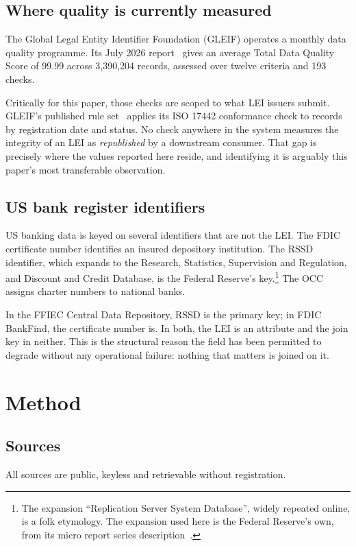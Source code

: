 \documentclass[11pt]{article}
\begin{document}
\subsection{Where quality is currently measured}
The Global Legal Entity Identifier Foundation (GLEIF) operates a monthly data quality programme. Its July 2026 report~\cite{gleifdq} gives an average Total Data Quality Score of 99.99 across 3,390,204 records, assessed over twelve criteria and 193 checks.

Critically for this paper, those checks are scoped to what LEI issuers submit. GLEIF's published rule set~\cite{gleifrules} applies its ISO 17442 conformance check to records by registration date and status. No check anywhere in the system measures the integrity of an LEI as \emph{republished} by a downstream consumer. That gap is precisely where the values reported here reside, and identifying it is arguably this paper's most transferable observation.

\subsection{US bank register identifiers}
US banking data is keyed on several identifiers that are not the LEI. The FDIC certificate number identifies an insured depository institution. The RSSD identifier, which expands to the Research, Statistics, Supervision and Regulation, and Discount and Credit Database, is the Federal Reserve's key.\footnote{The expansion ``Replication Server System Database'', widely repeated online, is a folk etymology. The expansion used here is the Federal Reserve's own, from its micro report series description~\cite{rssd}.} The OCC assigns charter numbers to national banks.

In the FFIEC Central Data Repository, RSSD is the primary key; in FDIC BankFind, the certificate number is. In both, the LEI is an attribute and the join key in neither. This is the structural reason the field has been permitted to degrade without any operational failure: nothing that matters is joined on it.

\section{Method}

\subsection{Sources}
All sources are public, keyless and retrievable without registration.
\end{document}

